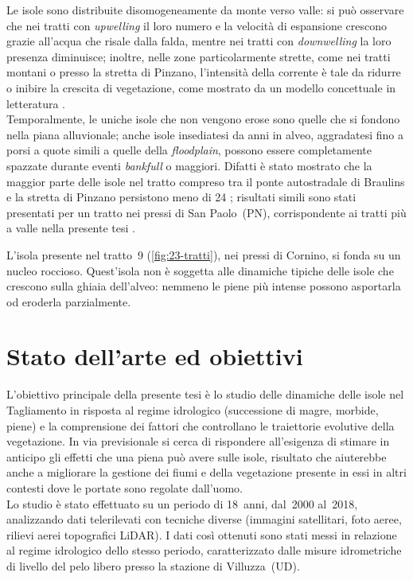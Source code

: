 Le isole sono distribuite disomogeneamente da monte verso valle: si può osservare che nei tratti con \emph{upwelling} il loro numero e la velocità di espansione crescono grazie all'acqua che risale dalla falda, mentre nei tratti con \emph{downwelling} la loro presenza diminuisce;
inoltre, nelle zone particolarmente strette, come nei tratti montani o presso la stretta di Pinzano, l'intensità della corrente è tale da ridurre o inibire la crescita di vegetazione, come mostrato da un modello concettuale in letteratura .
\\
Temporalmente, le uniche isole che non vengono erose sono quelle che si fondono nella piana alluvionale; anche isole insediatesi da anni in alveo, aggradatesi fino a porsi a quote simili a quelle della \emph{floodplain}, possono essere completamente spazzate durante eventi \emph{bankfull} o maggiori.
Difatti è stato mostrato che la maggior parte delle isole nel tratto compreso tra il ponte autostradale di Braulins e la stretta di Pinzano persistono meno di \SI{24}{\anni} ; risultati simili sono stati presentati per un tratto nei pressi di San Paolo~(PN), corrispondente ai tratti più a valle nella presente tesi .

L'isola presente nel tratto~9 (\cref{fig:23-tratti}), nei pressi di Cornino, si fonda su un nucleo roccioso.
Quest'isola non è soggetta alle dinamiche tipiche delle isole che crescono sulla ghiaia dell'alveo: nemmeno le piene più intense possono asportarla od eroderla parzialmente.


\section{Stato dell'arte ed obiettivi}
\label{sec:stato-arte-obiettivi}
L'obiettivo principale della presente tesi è lo studio delle dinamiche delle isole nel Tagliamento in risposta al regime idrologico (successione di magre, morbide, piene) e la comprensione dei fattori che controllano le traiettorie evolutive della vegetazione.
In via previsionale si cerca di rispondere all'esigenza di stimare in anticipo gli effetti che una piena può avere sulle isole, risultato che aiuterebbe anche a migliorare la gestione dei fiumi e della vegetazione presente in essi in altri contesti dove le portate sono regolate dall'uomo. 
\\
Lo studio è stato effettuato su un periodo di 18~anni, dal~2000 al~2018, analizzando dati telerilevati con tecniche diverse (immagini satellitari, foto aeree, rilievi aerei topografici LiDAR).
I dati così ottenuti sono stati messi in relazione al regime idrologico dello stesso periodo, caratterizzato dalle misure idrometriche di livello del pelo libero presso la stazione di Villuzza~(UD). 

